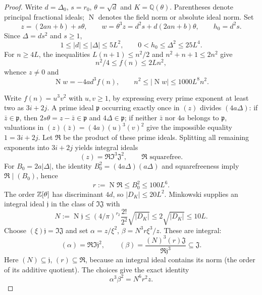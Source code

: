 \documentclass[11pt,reqno]{amsart}
\theoremstyle{definition}
\theoremstyle{remark}
\numberwithin{equation}{section}
\newcommand{\Q}{\mathbb Q}\newcommand{\C}{\mathbb C}
\newcommand{\Nm}{\operatorname{N}}
\begin{document}
\begin{proof}
Write $d=\Delta_0$, $s=r_0$, $\theta=\sqrt d$ and $K=\Q(\theta)$.
Parentheses denote principal fractional ideals; $\Nm$ denotes the field
norm or absolute ideal norm. Set
\[
 z=(2an+b)+s\theta,\qquad w=\theta^3z=d^2s+d(2an+b)\theta,
 \qquad h_0=d^2s.
\]
Since $\Delta=ds^2$ and $s\ge1$,
\begin{equation}
 1\le|d|\le|\Delta|\le5L^2,\qquad
 0<h_0\le\Delta^2\le25L^4.                      \label{eq:arith-1}
\end{equation}
For $n\ge4L$, the inequalities $L(n+1)\le n^2/2$ and
$n^2+n+1\le2n^2$ give
\begin{equation}
 n^2/4\le f(n)\le2Ln^2,                         \label{eq:arith-2}
\end{equation}
whence $z\ne0$ and
\begin{equation}
 \Nm w=-4ad^3f(n),\qquad
 n^2\le|\Nm w|\le1000L^8n^2.                    \label{eq:arith-3}
\end{equation}

Write $f(n)=u^3v^2$ with $u,v\ge1$, by expressing every prime exponent
at least two as $3i+2j$. A prime ideal $\mathfrak p$ occurring exactly
once in $(z)$ divides $(4a\Delta)$: if $\bar z\in\mathfrak p$, then
$2s\theta=z-\bar z\in\mathfrak p$ and $4\Delta\in\mathfrak p$;
if neither $\bar z$ nor $4a$ belongs to $\mathfrak p$, valuations in
$(z)(\bar z)=(4a)(u)^3(v)^2$ give the impossible equality $1=3i+2j$.
Let $\mathfrak R$ be the product of these prime ideals. Splitting all
remaining exponents into $3i+2j$ yields integral ideals
\[
 (z)=\mathfrak R\mathfrak I^3\mathfrak J^2,
 \qquad \mathfrak R\text{ squarefree}.
\]
For $B_0=2a|\Delta|$, the identity $B_0^2=(4a\Delta)(a\Delta)$ and
squarefreeness imply $\mathfrak R\mid(B_0)$, hence
\begin{equation}
 r:=\Nm\mathfrak R\le B_0^2\le100L^6.           \label{eq:arith-4}
\end{equation}
The order $\mathbb Z[\theta]$ has discriminant $4d$, so $|D_K|\le20L^2$.
Minkowski supplies an integral ideal $\mathfrak j$ in the class of
$\mathfrak I\mathfrak J$ with
\begin{equation}
 N:=\Nm\mathfrak j\le(4/\pi)^{r_2}\frac{2!}{2^2}\sqrt{|D_K|}
 \le2\sqrt{|D_K|}\le10L.                        \label{eq:arith-5}
\end{equation}
Choose $(\xi)\mathfrak j=\mathfrak I\mathfrak J$ and set
$\alpha=z/\xi^2$, $\beta=N^3r\xi^3/z$. These are integral:
\[
 (\alpha)=\mathfrak R\mathfrak I\mathfrak j^2,\qquad
 (\beta)=\frac{(N)^3(r)\mathfrak J}{\mathfrak R\mathfrak j^3}
 \subseteq\mathfrak J.
\]
Here $(N)\subseteq\mathfrak j$, $(r)\subseteq\mathfrak R$, because
an integral ideal contains its norm (the order of its additive quotient).
The choices give the exact identity
\begin{equation}
 \alpha^3\beta^2=N^6r^2z.                        \label{eq:arith-6}
\end{equation}


\end{proof}
\end{document}
